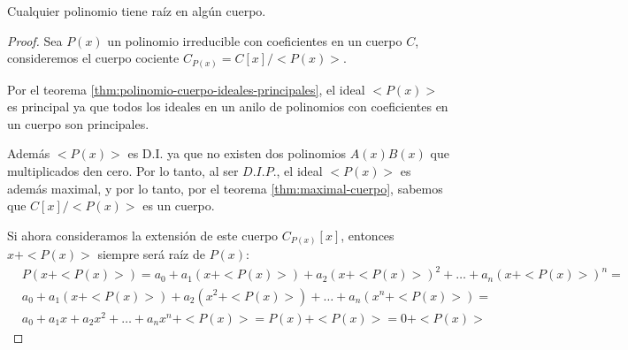 \begin{thm}[Kronecker]
    Cualquier polinomio tiene raíz en algún cuerpo.
\end{thm}

\begin{proof}
    Sea $P(x)$ un polinomio irreducible con coeficientes en un cuerpo $C$, consideremos el cuerpo cociente $C_{P(x)} = C[x] / <P(x)>$.

    Por el teorema \ref{thm:polinomio-cuerpo-ideales-principales}, el ideal $<P(x)>$ es principal ya que todos los ideales en un anilo de polinomios con coeficientes en un cuerpo son principales.

    Además $<P(x)>$ es D.I. ya que no existen dos polinomios $A(x)B(x)$ que multiplicados den cero. Por lo tanto, al ser $D.I.P.$, el ideal $<P(x)>$ es además maximal, y por lo tanto, por el teorema \ref{thm:maximal-cuerpo}, sabemos que $C[x] / <P(x)>$ es un cuerpo.

    Si ahora consideramos la extensión de este cuerpo $C_{P(x)}[x]$, entonces $x + <P(x)>$ siempre será raíz de $P(x)$:
    \begin{equation}
        \begin{split}
            & P(x + <P(x)>) = a_{0} + a_{1}(x + <P(x)>) + a_{2}(x + <P(x)>)^2 + \ldots + a_{n}(x + <P(x)>)^{n} =\\
            & a_{0} + a_{1}(x + <P(x)>) + a_2(x^2 + <P(x)>) + \ldots + a_{n}(x^{n} + <P(x)>) =\\
            & a_{0} + a_{1}x + a_{2}x^2 + \ldots + a_{n}x^{n} + <P(x)> = P(x) + <P(x)> = 0 + <P(x)> 
        \end{split}
    \end{equation}
\end{proof}

